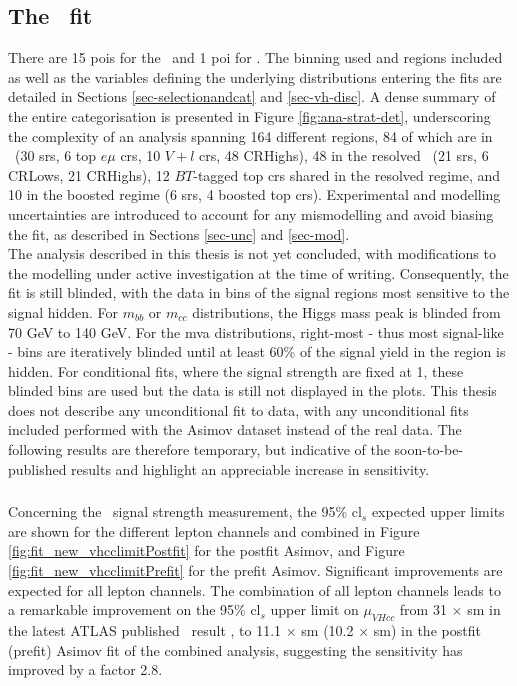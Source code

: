 \subsection[The \vhbc\ Fit]{The \boldvhbc\ fit}\label{subsec-subsecVHBCfit}
There are 15 \glspl{poi} for the \vhb\ and 1 \gls{poi} for \vhc. The binning used and regions included as well as the variables defining the underlying distributions entering the fits are detailed in Sections \ref{sec-selectionandcat} and \ref{sec-vh-disc}. A dense summary of the entire categorisation is presented in Figure \ref{fig:ana-strat-det}, underscoring the complexity of an analysis spanning 164 different regions, 84 of which are in \vhc\ (30 \glspl{sr}, 6 top $e\mu$ \glspl{cr}, 10 $V+l$ \glspl{cr}, 48 CRHighs), 48 in the resolved \vhb\ (21 \glspl{sr}, 6 CRLows, 21 CRHighs), 12 $BT$-tagged top \glspl{cr} shared in the resolved regime, and 10 in the boosted regime (6 \glspl{sr}, 4 boosted top \glspl{cr}). Experimental and modelling uncertainties are introduced to account for any mismodelling and avoid biasing the fit, as described in Sections \ref{sec-unc} and \ref{sec-mod}. \\

The analysis described in this thesis is not yet concluded, with modifications to the modelling under active investigation at the time of writing. Consequently, the fit is still blinded, with the data in bins of the signal regions most sensitive to the signal hidden. For $m_{bb}$ or $m_{cc}$ distributions, the Higgs mass peak is blinded from 70 GeV to 140 GeV. For the \gls{mva} distributions, right-most - thus most signal-like - bins are iteratively blinded until at least 60\% of the signal yield in the region is hidden. For conditional fits, where the signal strength are fixed at 1, these blinded bins are used but the data is still not displayed in the plots. This thesis does not describe any unconditional fit to data, with any unconditional fits included performed with the Asimov dataset instead of the real data. The following results are therefore temporary, but indicative of the soon-to-be-published results and highlight an appreciable increase in sensitivity. 

\subsubsection{\boldvhc}
Concerning the \vhc\ signal strength measurement, the 95\% \gls{cl}$_s$ expected upper limits are shown for the different lepton channels and combined in Figure \ref{fig:fit_new_vhcclimitPostfit} for the postfit Asimov, and Figure \ref{fig:fit_new_vhcclimitPrefit} for the prefit Asimov. Significant improvements are expected for all lepton channels. The combination of all lepton channels leads to a remarkable improvement on the 95\% \gls{cl}$_s$ upper limit on $\mu_{VHcc}$ from 31 $\times$ \gls{sm} in the latest ATLAS published \vhc\ result \cite{Collaboration:2721696}, to 11.1 $\times$ \gls{sm} (10.2 $\times$ \gls{sm}) in the postfit (prefit) Asimov fit of the combined analysis, suggesting the sensitivity has improved by a factor 2.8. \\

